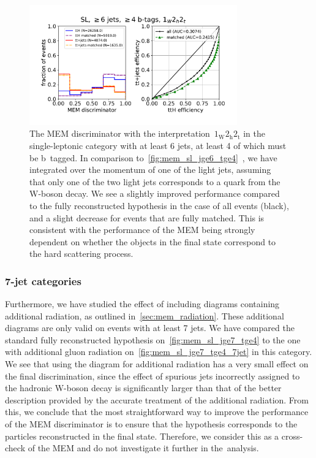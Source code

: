 \begin{figure}[ht]
\begin{centering}
\includegraphics[width = 0.8\textwidth]{figures/mem/mem_sl_jge6_tge4_1w2h2t.pdf}
\caption[MEM with the~$1_{\mathrm{W}} 2_{\mathrm{h}} 2_{\mathrm{t}}$ interpretation in the $\ge6$ jet, $\ge4$ b~tag category]{The MEM discriminator with the interpretation~$1_{\mathrm{W}} 2_{\mathrm{h}} 2_{\mathrm{t}}$ in the single-leptonic category with at least 6 jets, at least 4 of which must be b~tagged. In comparison to~\cref{fig:mem_sl_jge6_tge4}~, we have integrated over the momentum of one of the light jets, assuming that only one of the two light jets corresponds to a quark from the~$\mathrm{W}$-boson decay. We see a slightly improved performance compared to the fully reconstructed hypothesis in the case of all events (black), and a slight decrease for events that are fully matched. This is consistent with the performance of the MEM being strongly dependent on whether the objects in the final state correspond to the hard scattering process.}
\label{fig:mem_sl_jge6_tge4_1w2h2t}
\end{centering}
\end{figure}

\subsubsection{7-jet categories}
Furthermore, we have studied the effect of including diagrams containing additional radiation, as outlined in~\cref{sec:mem_radiation}. These additional diagrams are only valid on events with at least 7 jets. We have compared the standard fully reconstructed hypothesis on~\cref{fig:mem_sl_jge7_tge4} to the one with additional gluon radiation on~\cref{fig:mem_sl_jge7_tge4_7jet} in this category. We see that using the diagram for additional radiation has a very small effect on the final discrimination, since the effect of spurious jets incorrectly assigned to the hadronic W-boson decay is significantly larger than that of the better description provided by the accurate treatment of the additional radiation. From this, we conclude that the most straightforward way to improve the performance of the MEM discriminator is to ensure that the hypothesis corresponds to the particles reconstructed in the final state. Therefore, we consider this as a cross-check of the MEM and do not investigate it further in the~\ttHbb analysis.


